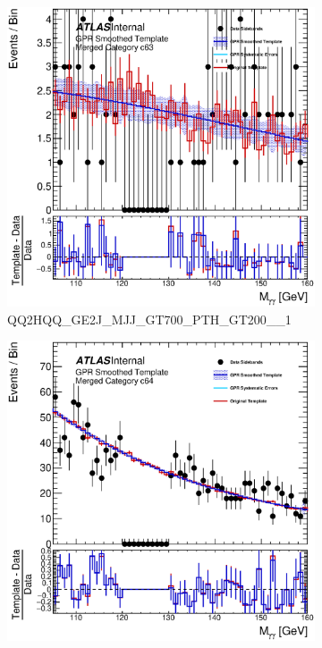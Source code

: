 \begin{figure} 
\begin{center}
\begin{subfigure}[T]{0.49\linewidth}
	\centering
	\includegraphics[width=\linewidth]{figures/background/gpr/coupCatTemplates/GPR_Smoothed_Plot_hmgg_c63.eps}
	\caption{QQ2HQQ\_GE2J\_MJJ\_GT700\_PTH\_GT200\_\_1}
\end{subfigure}
\begin{subfigure}[T]{0.49\linewidth}
	\centering
	\includegraphics[width=\linewidth]{figures/background/gpr/coupCatTemplates/GPR_Smoothed_Plot_hmgg_c64.eps}

\end{subfigure}
\end{center}
\end{figure}
